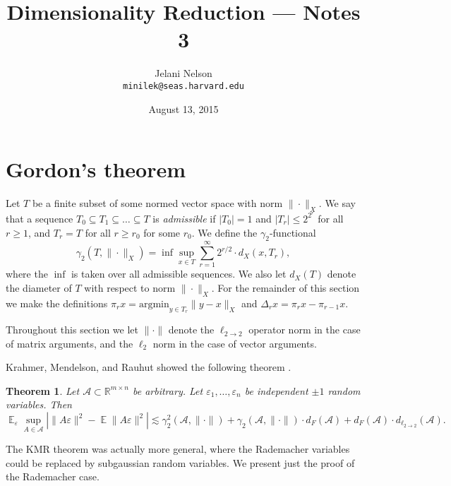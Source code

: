 \documentclass[12pt]{article}
\author{Jelani Nelson\\{}\texttt{minilek@seas.harvard.edu}}
\title{Dimensionality Reduction --- Notes 3}
\date{August 13, 2015}
\DeclareMathOperator*{\E}{\mathbb{E}}
\newcommand{\eps}{\varepsilon}
\newcommand{\R}{\mathbb{R}}
\newtheorem{theorem}{Theorem}
\begin{document}
\maketitle

\section{Gordon's theorem}

Let $T$ be a finite subset of some normed vector space with norm $\|\cdot \|_X$. We say that a sequence $T_0\subseteq T_1\subseteq \ldots \subseteq T$ is {\it admissible} if $|T_0| = 1$ and $|T_r| \le 2^{2^r}$ for all $r\ge 1$, and $T_r = T$ for all $r \ge r_0$ for some $r_0$. We define the $\gamma_2$-functional
$$ \gamma_2(T, \|\cdot \|_X) = \inf \sup_{x\in T} \sum_{r=1}^\infty 2^{r/2} \cdot d_X(x, T_r) ,$$
where the $\inf$ is taken over all admissible sequences.  We also let $d_X(T)$ denote the diameter of $T$ with respect to norm $\|\cdot\|_X$. For the remainder of this section we make the definitions $\pi_r x = \mathrm{argmin}_{y\in T_r} \|y - x\|_X$ and $\Delta_r x = \pi_r x - \pi_{r-1} x$.

Throughout this section we let $\|\cdot \|$ denote the $\ell_{2\rightarrow 2}$ operator norm in the case of matrix arguments, and the $\ell_2$ norm in the case of vector arguments. 

Krahmer, Mendelson, and Rauhut showed the following theorem \cite{KMR14}.

\begin{theorem}
Let $\mathcal{A}\subset \R^{m\times n}$ be arbitrary. Let $\eps_1,\ldots,\eps_n$ be independent $\pm 1$ random variables. Then
$$ \E_\eps \sup_{A\in\mathcal{A}} \left|\|A\eps\|^2 - \E\|A\eps\|^2\right| \lesssim \gamma_2^2(\mathcal{A}, \|\cdot\|) + \gamma_2(\mathcal{A}, \|\cdot\|)\cdot d_F(\mathcal{A}) + d_F(\mathcal{A})\cdot d_{\ell_{2\rightarrow 2}}(\mathcal{A}).$$
\end{theorem}

The KMR theorem was actually more general, where the Rademacher variables could be replaced by subgaussian random variables. We present just the proof of the Rademacher case.
\end{document}
